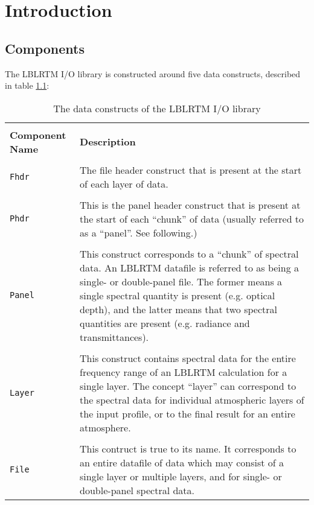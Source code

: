 \chapter{Introduction}


\section{Components}
\label{sec:components}

The LBLRTM I/O library is constructed around five data constructs, described in table \ref{tab:component_definitions}:
\begin{table}[htp]
  \centering
  \caption{The data constructs of the LBLRTM I/O library}
  \begin{tabular}{p{2.5cm} p{12cm}}
    \hline\\[-0.1cm]
    \sffamily\textbf{Component Name} & \sffamily\textbf{Description} \\
    \hline\hline\\[-0.2cm]
    \texttt{Fhdr}  & The file header construct that is present at the start of each layer of data. \\\\
    \texttt{Phdr}  & This is the panel header construct that is present at the start of each ``chunk'' of data (usually referred to as a ``panel''. See following.) \\\\
    \texttt{Panel} & This construct corresponds to a ``chunk'' of spectral data. An LBLRTM datafile is referred to as being a single- or double-panel file. The former means a single spectral quantity is present (e.g. optical depth), and the latter means that two spectral quantities are present (e.g. radiance and transmittances). \\\\
    \texttt{Layer} & This construct contains spectral data for the entire frequency range of an LBLRTM calculation for a single layer. The concept ``layer'' can correspond to the spectral data for individual atmospheric layers of the input profile, or to the final result for an entire atmosphere. \\\\
    \texttt{File}  & This contruct is true to its name. It corresponds to an entire datafile of data which may consist of a single layer or multiple layers, and for single- or double-panel spectral data. \\
  \hline
  \end{tabular}
  \label{tab:component_definitions}
\end{table}

